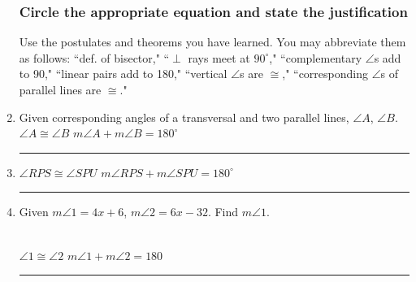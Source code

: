\begin{enumerate}
\newpage


\subsubsection*{Circle the appropriate equation and state the justification}
Use the postulates and theorems you have learned. You may abbreviate them as follows: ``def. of bisector," ``$\perp$ rays meet at $90^\circ$," ``complementary $\angle$s add to 90," ``linear pairs add to 180," ``vertical $\angle$s are $\cong$," ``corresponding $\angle$s of parallel lines are $\cong$."

\item Given corresponding angles of a transversal and two parallel lines, $\angle A$, $\angle B$.\\[0.5cm]
$\angle A \cong \angle B$ \hspace{1cm} $m \angle A + m \angle B=180^\circ$ \hspace{0.5cm} \rule{5cm}{0.15mm} \vspace{0.25cm}

\item $\angle RPS \cong \angle SPU$ \hspace{0.25cm} $m \angle RPS + m \angle SPU = 180^\circ$ \hspace{0.25cm} \rule{6cm}{0.15mm}  \vspace{0.25cm}

\item Given $m \angle 1 = 4x+6$, $m \angle 2 = 6x-32$. Find $m \angle 1$.
\\[0.5cm]
$\angle 1 \cong \angle 2$ \hspace{1cm} $m\angle 1 + m\angle 2 =  180$ \hspace{0.5cm} \rule{6cm}{0.15mm}


\end{enumerate}
